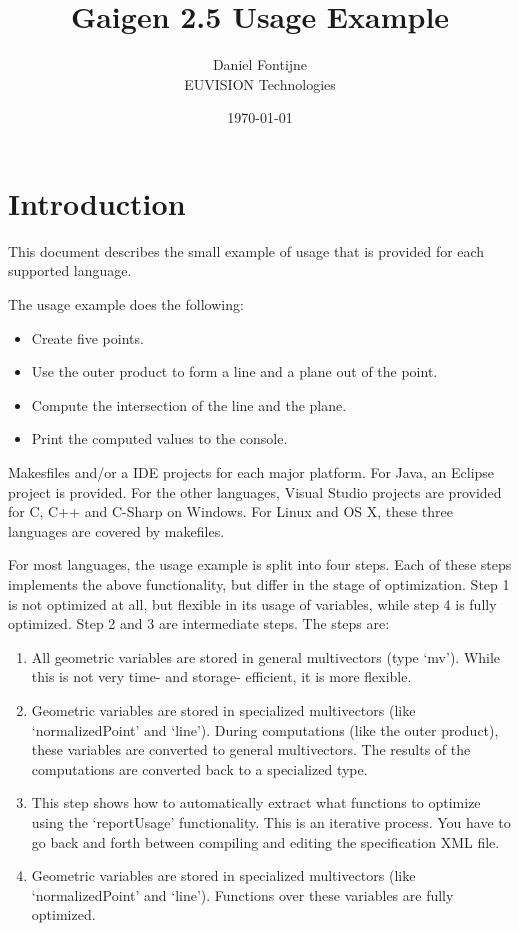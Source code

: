 \documentclass[10pt, a4paper]{article}
\begin{document}
\title{Gaigen 2.5 Usage Example}
\author{
Daniel Fontijne\\EUVISION Technologies
}
\date{\today}
\maketitle

\section{Introduction}

This document describes the small example of usage that is provided for each supported language.

The usage example does the following:
\begin{itemize}
\item Create five points.
\item Use the outer product to form a line and a plane out of the point.
\item Compute the intersection of the line and the plane.
\item Print the computed values to the console.
\end{itemize}

Makesfiles and/or a IDE projects for each major platform. For Java,
an Eclipse project is provided. For the other languages, Visual Studio projects 
are provided for C, C++ and C-Sharp on Windows. For Linux and OS X, these three
languages are covered by makefiles.

For most languages, the usage example is split into four steps. Each of these steps implements
the above functionality, but differ in the stage of optimization. Step 1 is not optimized
at all, but flexible in its usage of variables, while step 4 is fully optimized. Step 2 and
3 are intermediate steps. The steps are:

\begin{enumerate}
\item All geometric variables are stored in general multivectors (type `mv'). While this is not
very time- and storage- efficient, it is more flexible.
\item Geometric variables are stored in specialized multivectors (like `normalizedPoint' and `line'). 
During computations (like the outer product), these variables are converted to general multivectors. 
The results of the computations are converted back to a specialized type.
\item This step shows how to automatically extract what functions to optimize using the 
`reportUsage' functionality. This is an iterative process. You have to go back and forth between
compiling and editing the specification XML file.
\item Geometric variables are stored in specialized multivectors (like `normalizedPoint' and `line'). 
Functions over these variables are fully optimized.
\end{enumerate}
\end{document}
